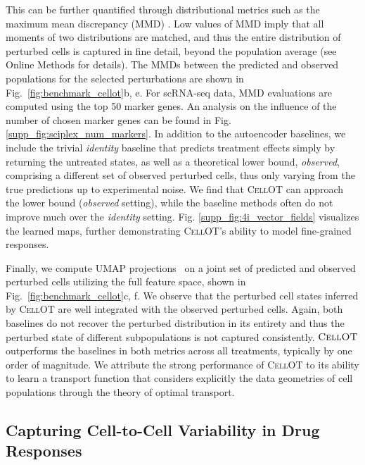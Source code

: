  This can be further quantified %
through distributional metrics such as the maximum mean discrepancy (MMD) \citep{gretton2012kernel}.
Low values of MMD imply that all moments of two distributions are matched, and thus the entire distribution of perturbed cells is captured in fine detail, beyond the population average (see Online Methods for details).
The MMDs between the predicted and observed populations for the selected perturbations are shown in Fig.~\ref{fig:benchmark_cellot}b, e.
For scRNA-seq data, MMD evaluations are computed using the top 50 marker genes. An analysis on the influence of the number of chosen marker genes can be found in Fig. \ref{supp_fig:sciplex_num_markers}.
In addition to the autoencoder baselines, we include the trivial \emph{identity} baseline that predicts treatment effects simply by returning the untreated states,
as well as a theoretical lower bound, \emph{observed}, comprising a different set of observed perturbed cells, thus only varying from the true predictions up to experimental noise.
We find that \textsc{CellOT} can approach the lower bound (\emph{observed} setting), while the baseline methods often do not improve much over the \emph{identity} setting.
Fig. \ref{supp_fig:4i_vector_fields} visualizes the learned maps, %
further demonstrating \textsc{CellOT}'s ability to model fine-grained responses.


 Finally, we compute UMAP projections~\citep{umap} on a joint set of predicted and observed perturbed cells utilizing the full feature space, shown in Fig.~\ref{fig:benchmark_cellot}c, f.
We observe that the perturbed cell states inferred by \textsc{CellOT} are well integrated with the observed perturbed cells. Again, both baselines do not recover the perturbed distribution in its entirety %
and thus the perturbed state of different subpopulations is not captured consistently.
$\textsc{CellOT}$ outperforms the baselines in both metrics across all treatments, typically by one order of magnitude.
We attribute the strong performance of \textsc{CellOT} to its ability to learn a transport function that considers explicitly the data geometries of cell populations through the theory of optimal transport.

\subsection{Capturing Cell-to-Cell Variability in Drug Responses}

